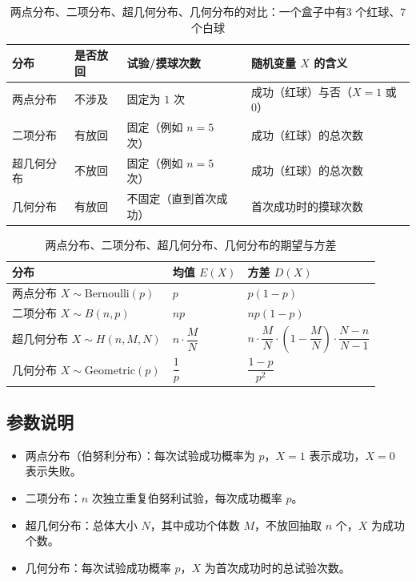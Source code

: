 \begin{table}[h]
\centering

\caption{两点分布、二项分布、超几何分布、几何分布的对比：一个盒子中有\(3\) 个红球、\(7\) 个白球}
\begin{tabular}{>{\centering\arraybackslash}p{2.8cm}
                >{\centering\arraybackslash}p{2cm}
                >{\centering\arraybackslash}p{4cm}
                >{\centering\arraybackslash}p{6cm}}
\toprule
\textbf{分布} & \textbf{是否放回} & \textbf{试验/摸球次数} & \textbf{随机变量 \(X\) 的含义} \\
\midrule
两点分布      & 不涉及 & 固定为 \(1\) 次      & 成功（红球）与否（\(X=1\) 或 \(0\)） \\
\hline
二项分布      & 有放回           & 固定（例如 \(n=5\) 次） & 成功（红球）的总次数 \\
\hline
超几何分布    & 不放回           & 固定（例如 \(n=5\) 次） & 成功（红球）的总次数 \\
\hline
几何分布      & 有放回           & 不固定（直到首次成功） & 首次成功时的摸球次数 \\
\bottomrule
\end{tabular}
\end{table}

\begin{table}[h]
\centering
\caption{两点分布、二项分布、超几何分布、几何分布的期望与方差}
\begin{tabular}{>{\centering\arraybackslash}p{3cm}
                >{\centering\arraybackslash}p{3.5cm}
                >{\centering\arraybackslash}p{4cm}}
\toprule
\textbf{分布} & \textbf{均值 \(E(X)\)} & \textbf{方差 \(D(X)\)} \\
\midrule
两点分布 \(X \sim \text{Bernoulli}(p)\) 
& \(p\) 
& \(p(1-p)\) \\
\hline
二项分布 \(X \sim B(n, p)\) 
& \(np\) 
& \(np(1-p)\) \\
\hline
超几何分布 \(X \sim H(n, M, N)\) 
& \(n \cdot \dfrac{M}{N}\) 
& \(n \cdot \dfrac{M}{N} \cdot \left(1-\dfrac{M}{N}\right) \cdot \dfrac{N-n}{N-1}\) \\
\hline
几何分布 \(X \sim \text{Geometric}(p)\) 
& \(\dfrac{1}{p}\) 
& \(\dfrac{1-p}{p^{2}}\) \\
\bottomrule
\end{tabular}
\end{table}

\subsection*{参数说明}
\begin{itemize}
  \item 两点分布（伯努利分布）：每次试验成功概率为 \(p\)，\(X=1\) 表示成功，\(X=0\) 表示失败。
  \item 二项分布：\(n\) 次独立重复伯努利试验，每次成功概率 \(p\)。
  \item 超几何分布：总体大小 \(N\)，其中成功个体数 \(M\)，不放回抽取 \(n\) 个，\(X\) 为成功个数。
  \item 几何分布：每次试验成功概率 \(p\)，\(X\) 为首次成功时的总试验次数。
\end{itemize}

